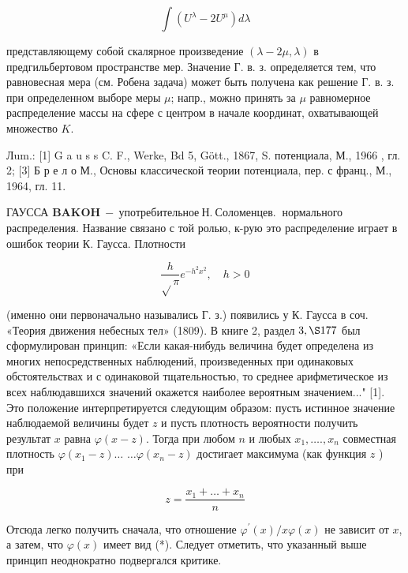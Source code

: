 \documentclass[10pt]{article}
\begin{document}
\[

\int\left(U^{\lambda}-2 U^{\mu}\right) d \lambda

\]



представляющему собой скалярное произведение $(\lambda-2 \mu, \lambda)$ в предгильбертовом пространстве мер. Значение Г. в. з. определяется тем, что равновесная мера (см. Робена задача) может быть получена как решение Г. в. з. при определенном выборе меры $\mu$; напр., можно принять за $\mu$ равномерное распределение массы на сфере с центром в начале координат, охватывающей множество $K$.



Лum.: [1] G a u s s C. F., Werke, Bd 5, Gött., 1867, S. потенциала, М., 1966 , гл. 2; [3] Б р е л о М., Основы классической теории потенциала, пер. с франц., М., 1964, гл. 11.



ГАУССА $\boldsymbol{B A K O H ~ - ~ у п о т р е б и т е л ь н о е ~ Н . ~ С о л о м е н ц е в . ~}$ нормального распределения. Название связано с той ролью, к-рую это распределение играет в ошибок теории К. Гаусса. Плотности



\[

\frac{h}{\sqrt{ } \pi} e^{-h^{2} x^{2}}, \quad h>0

\]



(именно они первоначально назывались Г. з.) появились у К. Гаусса в соч. «Теория движения небесных тел» (1809). В книге 2, раздел $3, \S 177$ был сформулирован принцип: «Если какая-нибудь величина будет определена из многих непосредственных наблюдений, произведенных при одинаковых обстоятельствах и с одинаковой тщательностью, то среднее арифметическое из всех наблюдавшихся значений окажется наиболее вероятным значением..." [1]. Это положение интерпретируется следующим образом: пусть истинное значение наблюдаемой величины будет $z$ и пусть плотность вероятности получить результат $x$ равна $\varphi(x-z)$. Тогда при любом $n$ и любых $x_{1}, \ldots ., x_{n}$ совместная плотность $\varphi\left(x_{1}-z\right) \ldots$ $\ldots \varphi\left(x_{n}-z\right)$ достигает максимума (как функция $z$ ) при



\[

z=\frac{x_{1}+\ldots+x_{n}}{n}

\]



Отсюда легко получить сначала, что отношение $\varphi^{\prime}(x) / x \varphi(x)$ не зависит от $x$, а затем, что $\varphi(x)$ имеет вид (*). Следует отметить, что указанный выше принцип неоднократно подвергался критике.
\end{document}
